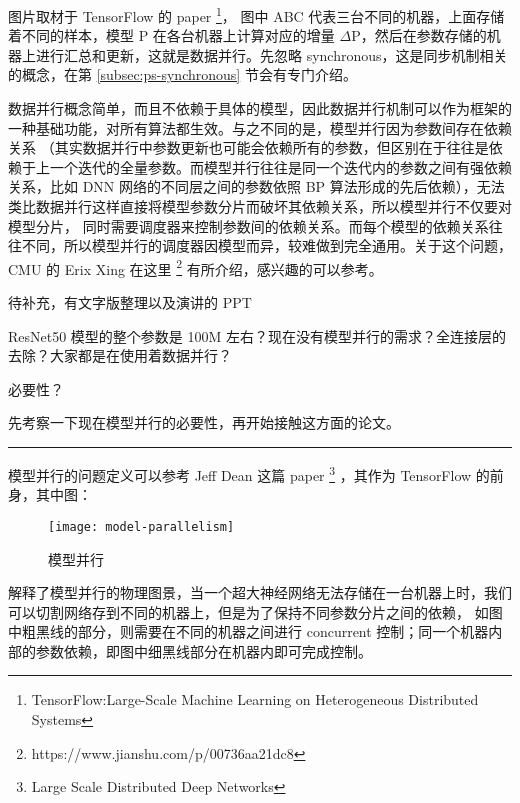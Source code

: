 图片取材于 TensorFlow 的 paper%
\footnote{TensorFlow:Large-Scale Machine Learning on Heterogeneous Distributed Systems}，
图中 ABC 代表三台不同的机器，上面存储着不同的样本，模型 P 在各台机器上计算对应的增量 $\Delta$P，然后在参数存储的机器上进行汇总和更新，这就是数据并行。先忽略 synchronous，这是同步机制相关的概念，在第 \ref{subsec:ps-synchronous} 节会有专门介绍。

数据并行概念简单，而且不依赖于具体的模型，因此数据并行机制可以作为框架的一种基础功能，对所有算法都生效。与之不同的是，模型并行因为参数间存在依赖关系
（其实数据并行中参数更新也可能会依赖所有的参数，但区别在于往往是依赖于上一个迭代的全量参数。而模型并行往往是同一个迭代内的参数之间有强依赖关系，比如
DNN 网络的不同层之间的参数依照 BP 算法形成的先后依赖），无法类比数据并行这样直接将模型参数分片而破坏其依赖关系，所以模型并行不仅要对模型分片，
同时需要调度器来控制参数间的依赖关系。而每个模型的依赖关系往往不同，所以模型并行的调度器因模型而异，较难做到完全通用。关于这个问题，CMU 的 Erix Xing 在这里%
\footnote{https://www.jianshu.com/p/00736aa21dc8}
有所介绍，感兴趣的可以参考。

\begin{newnote}
待补充，有文字版整理以及演讲的 PPT
\end{newnote}

\begin{newnote}[现在模型并行的必要性]
ResNet50 模型的整个参数是 100M 左右？现在没有模型并行的需求？全连接层的去除？大家都是在使用着数据并行？

必要性？
\end{newnote}

\begin{newnote}[对于模型并行的调研或相关论文可以推后]
先考察一下现在模型并行的必要性，再开始接触这方面的论文。
\end{newnote}

\noindent\rule[0.25\baselineskip]{\textwidth}{1pt}

模型并行的问题定义可以参考 Jeff Dean 这篇 paper
\footnote{Large Scale Distributed Deep Networks}
，其作为 TensorFlow 的前身，其中图：

\begin{figure}[hbtp]
\centering
\texttt{[image: model-parallelism]}
\caption{模型并行}
\label{fig:model-parallelism}
\end{figure}

解释了模型并行的物理图景，当一个超大神经网络无法存储在一台机器上时，我们可以切割网络存到不同的机器上，但是为了保持不同参数分片之间的依赖，
如图中粗黑线的部分，则需要在不同的机器之间进行 concurrent 控制；同一个机器内部的参数依赖，即图中细黑线部分在机器内即可完成控制。

